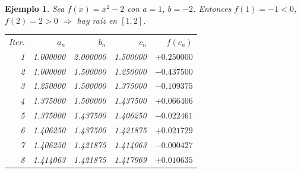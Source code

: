 \documentclass[12pt]{article}
\newtheorem{Ejem}{Ejemplo}%
\begin{document}
\begin{Ejem} Sea $f(x)=x^2-2$ con $a=1$, $b=-2$. Entonces $f(1)=-1<0$, $f(2)=2>0$ $\Rightarrow$ hay raíz en $[1,2]$.

\begin{center}
\begin{tabular}{@{}rrrrr@{}}
Iter. & $a_n$ & $b_n$ & $c_n$ & $f(c_n)$ \\
1 & 1.000000 & 2.000000 & 1.500000 & $+0.250000$ \\
2 & 1.000000 & 1.500000 & 1.250000 & $-0.437500$ \\
3 & 1.250000 & 1.500000 & 1.375000 & $-0.109375$ \\
4 & 1.375000 & 1.500000 & 1.437500 & $+0.066406$ \\
5 & 1.375000 & 1.437500 & 1.406250 & $-0.022461$ \\
6 & 1.406250 & 1.437500 & 1.421875 & $+0.021729$ \\
7 & 1.406250 & 1.421875 & 1.414063 & $-0.000427$ \\
8 & 1.414063 & 1.421875 & 1.417969 & $+0.010635$ \\
\end{tabular}
\end{center}
\end{Ejem}
\end{document}
